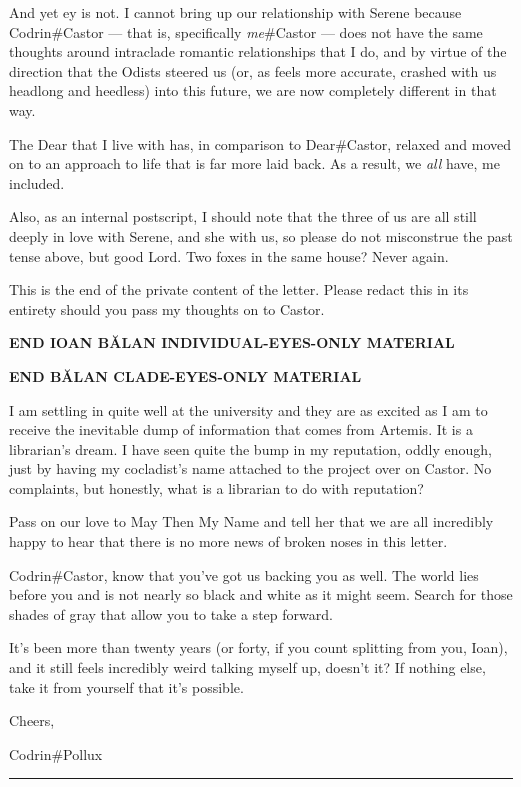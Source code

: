 And yet ey is not. I cannot bring up our relationship with Serene because Codrin\#Castor — that is, specifically \emph{me}\#Castor — does not have the same thoughts around intraclade romantic relationships that I do, and by virtue of the direction that the Odists steered us (or, as feels more accurate, crashed with us headlong and heedless) into this future, we are now completely different in that way.

The Dear that I live with has, in comparison to Dear\#Castor, relaxed and moved on to an approach to life that is far more laid back. As a result, we \emph{all} have, me included.

Also, as an internal postscript, I should note that the three of us are all still deeply in love with Serene, and she with us, so please do not misconstrue the past tense above, but good Lord. Two foxes in the same house? Never again.

This is the end of the private content of the letter. Please redact this in its entirety should you pass my thoughts on to Castor.

\textbf{END IOAN BĂLAN INDIVIDUAL-EYES-ONLY MATERIAL}

\textbf{END BĂLAN CLADE-EYES-ONLY MATERIAL}

I am settling in quite well at the university and they are as excited as I am to receive the inevitable dump of information that comes from Artemis. It is a librarian's dream. I have seen quite the bump in my reputation, oddly enough, just by having my cocladist's name attached to the project over on Castor. No complaints, but honestly, what is a librarian to do with reputation?

Pass on our love to May Then My Name and tell her that we are all incredibly happy to hear that there is no more news of broken noses in this letter.

Codrin\#Castor, know that you've got us backing you as well. The world lies before you and is not nearly so black and white as it might seem. Search for those shades of gray that allow you to take a step forward.

It's been more than twenty years (or forty, if you count splitting from you, Ioan), and it still feels incredibly weird talking myself up, doesn't it? If nothing else, take it from yourself that it's possible.

Cheers,

Codrin\#Pollux

\begin{center}\rule{0.5\linewidth}{0.5pt}\end{center}

